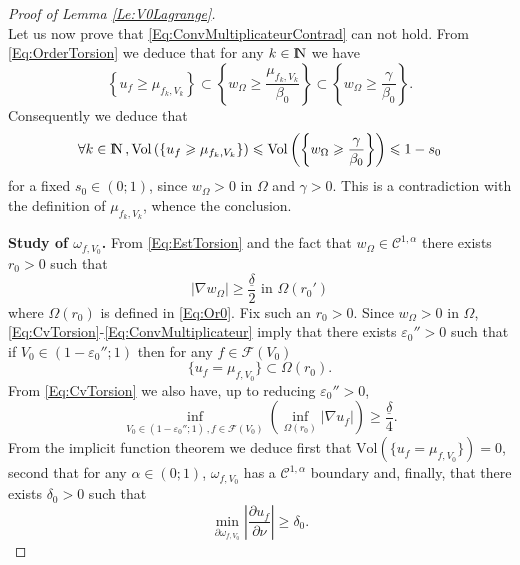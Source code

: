 \documentclass{article}
\newcommand{\N}{\textnormal{I\kern-0.21emN}}
\renewcommand{\geq}{\geqslant}
\renewcommand{\leq}{\leqslant}
\def\e{{\varepsilon}}
\def\O{{\Omega}}
\def\n{{\nabla}}
\numberwithin{equation}{section}
\begin{document}
\begin{proof}[Proof of Lemma \ref{Le:V0Lagrange}]
\begin{equation}
\end{equation}
Let us now prove that \eqref{Eq:ConvMultiplicateurContrad} can not hold. From \eqref{Eq:OrderTorsion} we deduce that for any $k\in \N$ we have 
\[ \left\{u_f\geq \mu_{f_k,V_k}\right\}\subset \left\{ w_\O\geq \frac{\mu_{f_k,V_k}}{\beta_0}\right\}\subset \left\{ w_\O\geq \frac{\gamma}{\beta_0}\right\}.\]
Consequently we deduce that 
\[ \forall k\in \N\,, \mathrm{Vol}\left(\left\{u_f\geq \mu_{f_k,V_k}\right\}\right)\leq  \mathrm{Vol}\left(\left\{ w_\O\geq \frac{\gamma}{\beta_0}\right\}\right)\leq 1-s_0
\] for a fixed $s_0\in (0;1)$, since $w_\O>0$ in $\O$ and $\gamma>0$. This is a contradiction with the definition of $\mu_{f_k,V_k}$, whence the conclusion.

\medskip

\noindent \textbf{Study of $\omega_{f,V_0}$.}
From \eqref{Eq:EstTorsion} and the fact that $w_\O \in \mathscr C^{1,\alpha}$ there exists $r_0>0$ such that 
\[ \left|\n w_\O \right|\geq \frac{\underline \delta}2\text{ in }\O(r_0')\] where $\O(r_0)$ is defined in \eqref{Eq:Or0}. Fix such an $r_0>0$.  Since $w_\O>0$ in $\O$, \eqref{Eq:CvTorsion}-\eqref{Eq:ConvMultiplicateur} imply that there exists $\e_0''>0$ such that if $V_0\in (1-\e_0'';1)$ then for any $f\in \mathcal F(V_0)$
\[\{u_f=\mu_{f,V_0}\}\subset \O(r_0).\]
From \eqref{Eq:CvTorsion} we also have, up to reducing $\e_0''>0$,
\[ \inf_{V_0\in (1-\e_0'';1)\,, f \in \mathcal F(V_0)}\left(\inf_{\O(r_0)} \left|\n u_f\right|\right)\geq \frac{\underline\delta}4.\] From the implicit function theorem we deduce first that $\mathrm{Vol}\left(\{u_f=\mu_{f,V_0}\}\right)=0$, second that for any $\alpha \in (0;1)$, $\omega_{f,V_0}$ has a $\mathscr C^{1,\alpha}$ boundary and, finally, that there exists $\delta_0>0$ such that 
\[ \min_{\partial \omega_{f,V_0}} \left| \frac{\partial u_f}{\partial \nu} \right|\geq \delta_0.\]


\end{proof}
\end{document}
